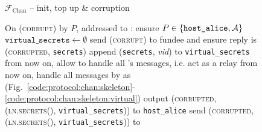 \begin{figure}[H]
\begin{systembox}{$\mathcal{F}_{\mathrm{Chan}}$ -- init, top up \& corruption}
\begin{algorithmic}[1]
      \State On (\textsc{corrupt}) by $P$, addressed to \alice:
      \Indent
        \State ensure $P \in \{\texttt{host\_alice}, \mathcal{A}\}$
        \State $\texttt{virtual\_secrets} \gets \emptyset$
          \State send (\textsc{corrupt}) to fundee and ensure reply is
          (\textsc{corrupted}, \texttt{secrets})
          \State append (\texttt{secrets}, \textit{vid}) to
          \texttt{virtual\_secrets}
        \EndFor
        \State from now on, allow \adversary to handle all \alice's messages,
        i.e. act as a relay
          \State from now on, handle all messages by \bob as \pchan
          (Fig.~\ref{code:protocol:chan:skeleton}-\ref{code:protocol:chan:skeleton:virtual})
        \EndIf
          \State output (\textsc{corrupted}, (\textsc{ln.secrets}(\alice),
          \texttt{virtual\_secrets})) to \texttt{host\_alice}
        \Else \: 
          \State send (\textsc{corrupted}, (\textsc{ln.secrets}(\alice),
          \texttt{virtual\_secrets})) to \adversary
        \EndIf
      \EndIndent
    \end{algorithmic}
  \end{systembox}
  \caption{}
  \label{code:functionality:chan:skeleton:init}
\end{figure}

